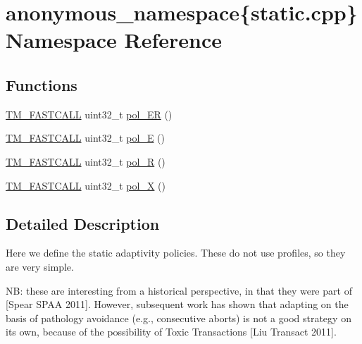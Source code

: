 \hypertarget{namespaceanonymous__namespace_02static_8cpp_03}{\section{anonymous\-\_\-namespace\{static.\-cpp\} Namespace Reference}
\label{namespaceanonymous__namespace_02static_8cpp_03}
}
\subsection*{Functions}
\begin{DoxyCompactItemize}
\item 
\hyperlink{platform_8hpp_a8b5d728e6eed8f368f9966f637d2f719}{T\-M\-\_\-\-F\-A\-S\-T\-C\-A\-L\-L} uint32\-\_\-t \hyperlink{namespaceanonymous__namespace_02static_8cpp_03_a356adb65bf55070273b42e289177d08a}{pol\-\_\-\-E\-R} ()
\item 
\hyperlink{platform_8hpp_a8b5d728e6eed8f368f9966f637d2f719}{T\-M\-\_\-\-F\-A\-S\-T\-C\-A\-L\-L} uint32\-\_\-t \hyperlink{namespaceanonymous__namespace_02static_8cpp_03_ae9990f5d808082c67e85dd51b5679732}{pol\-\_\-\-E} ()
\item 
\hyperlink{platform_8hpp_a8b5d728e6eed8f368f9966f637d2f719}{T\-M\-\_\-\-F\-A\-S\-T\-C\-A\-L\-L} uint32\-\_\-t \hyperlink{namespaceanonymous__namespace_02static_8cpp_03_aa824c84a6c1fe13a580dace00ad444c8}{pol\-\_\-\-R} ()
\item 
\hyperlink{platform_8hpp_a8b5d728e6eed8f368f9966f637d2f719}{T\-M\-\_\-\-F\-A\-S\-T\-C\-A\-L\-L} uint32\-\_\-t \hyperlink{namespaceanonymous__namespace_02static_8cpp_03_ae7874d79d4bed12301c4b8cfa73510ab}{pol\-\_\-\-X} ()
\end{DoxyCompactItemize}


\subsection{Detailed Description}
Here we define the static adaptivity policies. These do not use profiles, so they are very simple.

N\-B\-: these are interesting from a historical perspective, in that they were part of \mbox{[}Spear S\-P\-A\-A 2011\mbox{]}. However, subsequent work has shown that adapting on the basis of pathology avoidance (e.\-g., consecutive aborts) is not a good strategy on its own, because of the possibility of Toxic Transactions \mbox{[}Liu Transact 2011\mbox{]}. 

